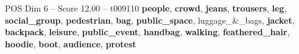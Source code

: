 \begin{textsample}{POS Dim 6 – Score 12.00 – t009110}  \label{ex:f6_pos_034}
\textbf{people}, \textbf{crowd}, \textbf{jeans}, \textbf{trousers}, \textbf{leg}, \textbf{social\_group}, \textbf{pedestrian}, \textbf{bag}, \textbf{public\_space}, luggage\_\&\_bags, \textbf{jacket}, \textbf{backpack}, \textbf{leisure}, \textbf{public\_event}, \textbf{handbag}, \textbf{walking}, \textbf{feathered\_hair}, \textbf{hoodie}, \textbf{boot}, \textbf{audience}, \textbf{protest}

\end{textsample}
